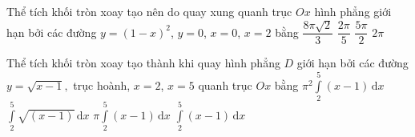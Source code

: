 	\begin{ex}%
		Thể tích khối tròn xoay tạo nên do quay xung quanh trục $Ox$ hình phẳng giới hạn bởi các đường $y=\left(1-x\right)^2$, $y=0$, $x=0$, $x=2$ bằng 
		\choice
		{$\dfrac{8\pi\sqrt{2}}{3}$}
		{\True $\dfrac{2\pi}{5}$}
		{$\dfrac{5\pi}{2}$}
		{$2\pi$}
	\end{ex}

	\begin{ex}%
		Thể tích khối tròn xoay tạo thành khi quay hình phẳng $D$ giới hạn bởi các đường $y=\sqrt{x-1},$ trục hoành, $x=2$, $x=5$ quanh trục $Ox$ bằng
		\choice
		{$\pi^2\displaystyle\int\limits_2^5(x-1)\mathrm{\,d}x$}
		{$\displaystyle\int\limits_2^5\sqrt{(x-1)}\mathrm{\,d}x$}
		{\True $\pi\displaystyle\int\limits_2^5(x-1)\mathrm{\,d}x$}
		{$\displaystyle\int\limits_2^5(x-1)\mathrm{\,d}x$}
	\end{ex}

